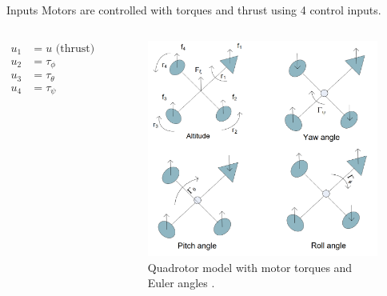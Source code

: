 \documentclass{thesisbeamer}
\begin{document}
\begin{frame}[t]{Inputs} \vspace{4pt}
Motors are controlled with torques and thrust using 4 control inputs.


\begin{columns}



\begin{align*}
u_1 &= u \text{ (thrust)}\\
u_2 &= \tau_{\phi} \\
u_3 &= \tau_{\theta} \\
u_4 &= \tau_{\psi}
\end{align*}

\vspace{2cm}


\begin{figure}[h]
\centering
\includegraphics[width=\textwidth]{Images/Modeling/Fantoni_a}
\caption{Quadrotor model with motor torques and Euler angles \cite{Fantoni2016}.}
\label{Fantoni_a}
\end{figure}
\end{columns}
\end{frame}

\end{document}

